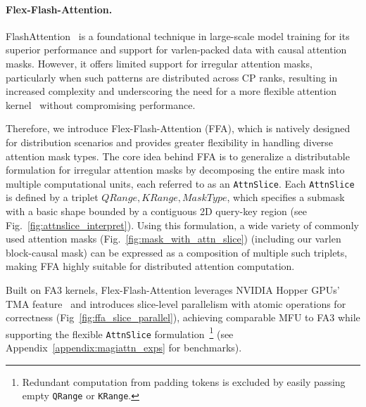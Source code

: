 \paragraph{Flex-Flash-Attention.}\label{sec:magiattn_ffa}


FlashAttention~\citep{dao2022flashattention, dao2023flashattention, shah2024flashattention3fastaccurateattention} is a foundational technique in large-scale model training for its superior performance and support for varlen-packed data with causal attention masks. However, it offers limited support for irregular attention masks, particularly when such patterns are distributed across CP ranks, resulting in increased complexity and underscoring the need for a more flexible attention kernel~\citep{pytorch_sdpa, dong2024flexattentionprogrammingmodel,wang2025flashmaskefficientrichmask} without compromising performance.

Therefore, we introduce Flex-Flash-Attention (FFA), which is natively designed for distribution scenarios and provides greater flexibility in handling diverse attention mask types. The core idea behind FFA is to generalize a distributable formulation for irregular attention masks by decomposing the entire mask into multiple computational units, each referred to as an \texttt{AttnSlice}. Each \texttt{AttnSlice} is defined by a triplet \texttt{\(QRange, KRange, MaskType\)}, which specifies a submask with a basic shape bounded by a contiguous 2D query-key region (see Fig.~\ref{fig:attnslice_interpret}). Using this formulation, a wide variety of commonly used attention masks (Fig.~\ref{fig:mask_with_attn_slice}) (including our varlen block-causal mask) can be expressed as a composition of multiple such triplets, making FFA highly suitable for distributed attention computation.


Built on FA3 kernels, Flex-Flash-Attention leverages NVIDIA Hopper GPUs' TMA feature~\citep{nvidia2024accelerating} and introduces slice-level parallelism with atomic operations for correctness (Fig~\ref{fig:ffa_slice_parallel}), achieving comparable MFU to FA3 while supporting the flexible \texttt{AttnSlice} formulation~\footnote{Redundant computation from padding tokens is excluded by easily passing empty \texttt{QRange} or \texttt{KRange}.} (see Appendix~\ref{appendix:magiattn_exps} for benchmarks).







